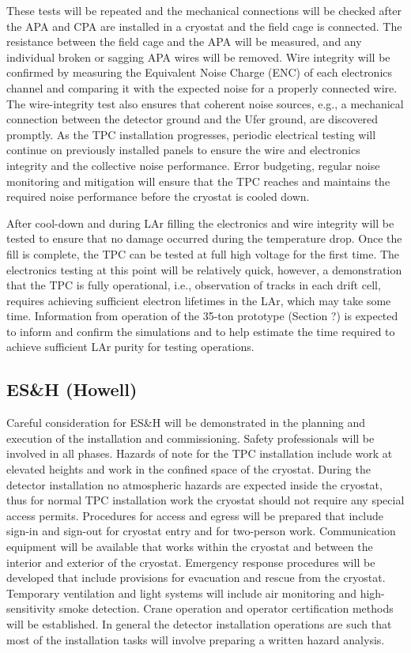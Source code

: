 These tests will be repeated and the mechanical connections will be checked after the APA and CPA are installed in a cryostat and the field cage is connected. The resistance between the field cage and the APA will be measured, 
and any individual broken or sagging APA wires will be removed. Wire integrity will be confirmed by measuring the Equivalent Noise Charge (ENC) of each electronics channel and comparing it with the expected noise for a 
properly connected wire. The wire-integrity test also ensures that coherent noise sources, e.g., a mechanical connection between the detector ground and the Ufer ground, are discovered promptly. As the TPC installation progresses, periodic electrical testing will continue on previously installed panels to ensure the wire 
and electronics integrity and the collective noise performance. Error budgeting, regular noise monitoring and mitigation will ensure that the TPC reaches and maintains the required noise performance before the cryostat is 
cooled down. 

After cool-down and during LAr filling the electronics and wire integrity will be tested to ensure that no damage occurred during the temperature drop. Once the fill is complete, the TPC can be tested at full high voltage for the 
first time. The electronics testing at this point will be relatively quick, however, a demonstration that the TPC is fully operational, i.e., observation of tracks in each drift cell, requires achieving sufficient electron lifetimes in the 
LAr, which may take some time. Information from operation of the 35-ton prototype (Section ?) is expected to inform and confirm the simulations and to help estimate the time required to achieve sufficient LAr purity for testing operations. 


\subsection{ES\&H (Howell)}
\label{fd:install:esh}

Careful consideration for ES\&H will be demonstrated in the planning and execution of the installation and commissioning. Safety professionals will be involved in all phases. Hazards of note for the TPC installation 
include work at elevated heights and work in the confined space of the cryostat. During the detector installation no atmospheric hazards are expected inside the cryostat, thus for normal TPC installation work the cryostat 
should not require any special access permits. Procedures for access and egress will be prepared that include sign-in and sign-out for cryostat entry and for two-person work. Communication equipment will be available that 
works within the cryostat and between the interior and exterior of the cryostat. Emergency response procedures will be developed that include provisions for evacuation and rescue from the cryostat. Temporary ventilation and 
light systems will include air monitoring and high-sensitivity smoke detection. Crane operation and operator certification methods will be established. In general the detector installation operations are such that most of the installation tasks will involve preparing a written hazard analysis. 

